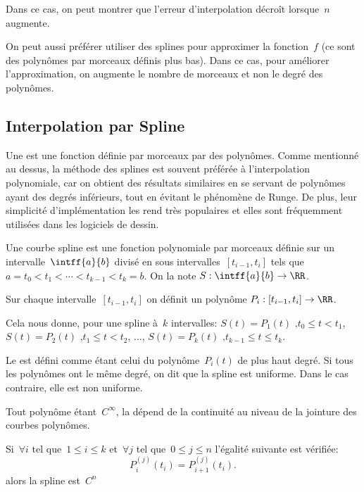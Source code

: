 Dans ce cas, on peut montrer que l'erreur d'interpolation décroît lorsque~$n$ augmente.

On peut aussi préférer utiliser des splines pour approximer la fonction~$f$ (ce sont des polynômes 
par morceaux définis plus bas). Dans ce cas, pour améliorer l'approximation, on augmente le nombre de 
morceaux et non le degré des polynômes.


\medskip
\subsection{Interpolation par Spline}

Une  est une fonction définie par morceaux par des polynômes.
Comme mentionné au dessus, la méthode des splines est souvent préférée à l'interpolation 
polynomiale, car on obtient des résultats similaires en se servant de polynômes ayant des degrés 
inférieurs, tout en évitant le phénomène de Runge.
De plus, leur simplicité d'implémentation les rend très populaires et elles sont fréquemment utilisées 
dans les logiciels de dessin.

\medskip
Une courbe spline est une fonction polynomiale par morceaux définie sur un intervalle~$\intff{a}{b}$ divisé 
en sous intervalles~$[t_{i-1}, t_i]$ tels que~$a = t_0 < t_1 < \cdots < t_{k-1} < t_k = b$. On la note 
$S: \intff{a}{b}\to \RR$.

Sur chaque intervalle~$[t_{i-1}, t_i]$ on définit un polynôme
$ P_i: [t_{i-1}, t_i] \to \RR$.

Cela nous donne, pour une spline à~$k$ intervalles:
$S(t) = P_1 (t) \mbox{ ,} t_0 \le t < t_1$, $S(t) = P_2 (t) \mbox{ ,} t_1 \le t < t_2$, ..., 
$S(t) = P_k (t) \mbox{ ,} t_{k-1} \le t \le t_k$.

\medskip
Le  est défini comme étant celui du polynôme~$P_i (t)$ de plus haut 
degré. Si tous les polynômes ont le même degré, on dit que la spline est uniforme. Dans le cas contraire, 
elle est non uniforme.

\medskip
Tout polynôme étant~$C^\infty$, la  dépend de la continuité 
au niveau de la jointure des courbes polynômes.

Si~$\forall i$ tel que~$1 \le i \le k$ et~$\forall j$ tel que~$0 \le j \le n$ l'égalité suivante est vérifiée:
\begin{equation}
  P_i^{(j)} (t_i) = P_{i+1}^{(j)} (t_i).
\end{equation}
alors la spline est~$C^n$


